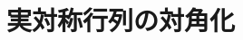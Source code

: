 \documentclass[../../topic_linear-algebra]{subfiles}
\begin{document}
\chapter{実対称行列の対角化}
\end{document}
